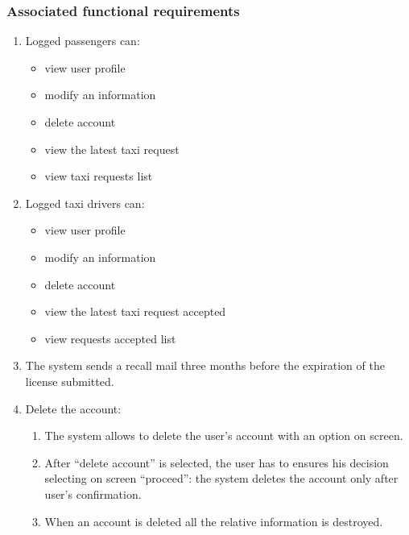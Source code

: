 \subsubsection{Associated functional requirements}
\begin{enumerate}

\item Logged passengers can:
\begin{itemize}
\item view user profile
\item modify an information
\item delete account
\item view the latest taxi request
\item view taxi requests list
\end{itemize}

\item Logged taxi drivers can:
\begin{itemize}
\item view user profile
\item modify an information
\item delete account
\item view the latest taxi request accepted
\item view requests accepted list
\end{itemize}

\item The system sends a recall mail three months before the expiration of the license submitted.

\item Delete the account:
\begin{enumerate}
\item The system allows to delete the user's account with an option on screen.
\item After ``delete account'' is selected, the user has to ensures his decision selecting on screen ``proceed'': the system deletes the account only after user's confirmation.
\item When an account is deleted all the relative information is destroyed.
\end{enumerate}


\end{enumerate}
